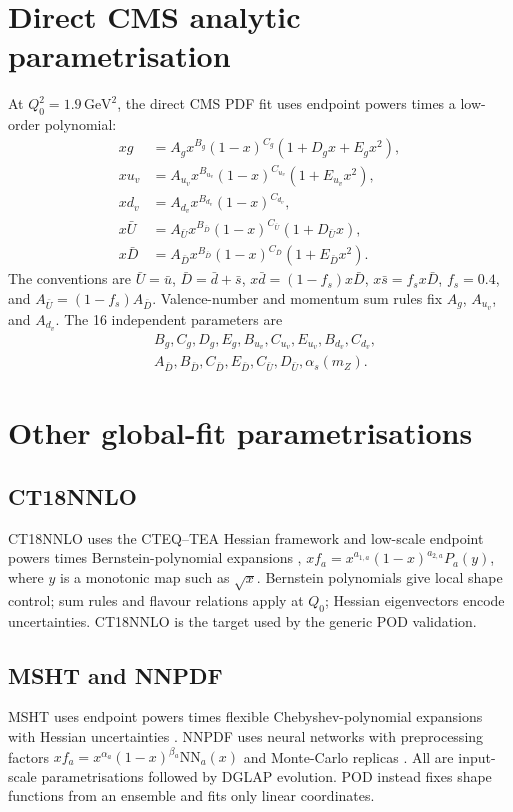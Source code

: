 \documentclass[11pt]{article}
\begin{document}
\section{Direct CMS analytic parametrisation}
At $Q_0^2=1.9\,\mathrm{GeV}^2$, the direct CMS PDF fit uses endpoint powers
times a low-order polynomial:
\begin{align}
  xg &= A_gx^{B_g}(1-x)^{C_g}(1+D_gx+E_gx^2),
  \\
  xu_v &= A_{u_v}x^{B_{u_v}}(1-x)^{C_{u_v}}(1+E_{u_v}x^2),
  \\
  xd_v &= A_{d_v}x^{B_{d_v}}(1-x)^{C_{d_v}},
  \\
  x\bar U &= A_{\bar U}x^{B_{\bar D}}(1-x)^{C_{\bar U}}
             (1+D_{\bar U}x),
  \\
  x\bar D &= A_{\bar D}x^{B_{\bar D}}(1-x)^{C_{\bar D}}
             (1+E_{\bar D}x^2).
\end{align}
The conventions are $\bar U=\bar u$, $\bar D=\bar d+\bar s$,
$x\bar d=(1-f_s)x\bar D$, $x\bar s=f_sx\bar D$, $f_s=0.4$, and
$A_{\bar U}=(1-f_s)A_{\bar D}$. Valence-number and momentum sum rules fix
$A_g$, $A_{u_v}$, and $A_{d_v}$. The 16 independent parameters are
\begin{align*}
  &B_g,C_g,D_g,E_g,B_{u_v},C_{u_v},E_{u_v},B_{d_v},C_{d_v},\\
  &A_{\bar D},B_{\bar D},C_{\bar D},E_{\bar D},C_{\bar U},D_{\bar U},
    \alpha_s(m_Z).
\end{align*}
\section{Other global-fit parametrisations}
\subsection{CT18NNLO}
CT18NNLO uses the CTEQ--TEA Hessian framework and low-scale endpoint powers times Bernstein-polynomial expansions \cite{CT18}, $xf_a=x^{a_{1,a}}(1-x)^{a_{2,a}}P_a(y)$, where $y$ is a monotonic map such as $\sqrt{x}$. Bernstein polynomials give local shape control; sum rules and flavour relations apply at $Q_0$; Hessian eigenvectors encode uncertainties. CT18NNLO is the target used by the generic POD validation.
\subsection{MSHT and NNPDF}
MSHT uses endpoint powers times flexible Chebyshev-polynomial expansions with Hessian uncertainties \cite{MSHT}. NNPDF uses neural networks with preprocessing factors $xf_a=x^{\alpha_a}(1-x)^{\beta_a}\mathrm{NN}_a(x)$ and Monte-Carlo replicas \cite{NNPDF}. All are input-scale parametrisations followed by DGLAP evolution. POD instead fixes shape functions from an ensemble and fits only linear coordinates.
\end{document}

